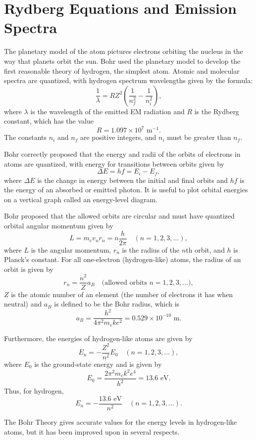\documentclass{report}
\begin{document}
\section{Rydberg Equations and Emission Spectra}

The planetary model of the atom pictures electrons orbiting the nucleus in the way that planets orbit the sun. Bohr used the planetary model to develop the first reasonable theory of hydrogen, the simplest atom. Atomic and molecular spectra are quantized, with hydrogen spectrum wavelengths given by the formula:
\[
	\frac{1}{\lambda} = R Z^2 \left( \frac{1}{n_f^2} - \frac{1}{n_i^2} \right),
\]
where $\lambda$ is the wavelength of the emitted EM radiation and $R$ is the Rydberg constant, which has the value
\[
	R = 1.097 \times 10^7 \text{ m}^{-1}.
\]
The constants $n_i$ and $n_f$ are positive integers, and $n_i$ must be greater than $n_f$.

Bohr correctly proposed that the energy and radii of the orbits of electrons in atoms are quantized, with energy for transitions between orbits given by
\[
	\Delta E = hf = E_i - E_f, \tag{30.3.22}
\]
where $\Delta E$ is the change in energy between the initial and final orbits and $hf$ is the energy of an absorbed or emitted photon. It is useful to plot orbital energies on a vertical graph called an energy-level diagram.

Bohr proposed that the allowed orbits are circular and must have quantized orbital angular momentum given by
\[
	L = m_e v_n r_n = n \frac{h}{2 \pi} \quad (n = 1, 2, 3, \ldots),
\]
where $L$ is the angular momentum, $r_n$ is the radius of the $n$th orbit, and $h$ is Planck's constant. For all one-electron (hydrogen-like) atoms, the radius of an orbit is given by
\[
	r_n = \frac{n^2}{Z} a_B \quad \text{(allowed orbits } n = 1, 2, 3, \ldots),
\]
$Z$ is the atomic number of an element (the number of electrons it has when neutral) and $a_B$ is defined to be the Bohr radius, which is
\[
	a_B = \frac{h^2}{4 \pi^2 m_e k e^2} = 0.529 \times 10^{-10} \text{ m}.
\]

Furthermore, the energies of hydrogen-like atoms are given by
\[
	E_n = -\frac{Z^2}{n^2} E_0 \quad (n = 1, 2, 3, \ldots),
\]
where $E_0$ is the ground-state energy and is given by
\[
	E_0 = \frac{2 \pi^2 m_e k^2 e^4}{h^2} = 13.6 \text{ eV}.
\]
Thus, for hydrogen,
\[
	E_n = -\frac{13.6 \text{ eV}}{n^2} \quad (n = 1, 2, 3, \ldots).
\]

The Bohr Theory gives accurate values for the energy levels in hydrogen-like atoms, but it has been improved upon in several respects.
\end{document}
